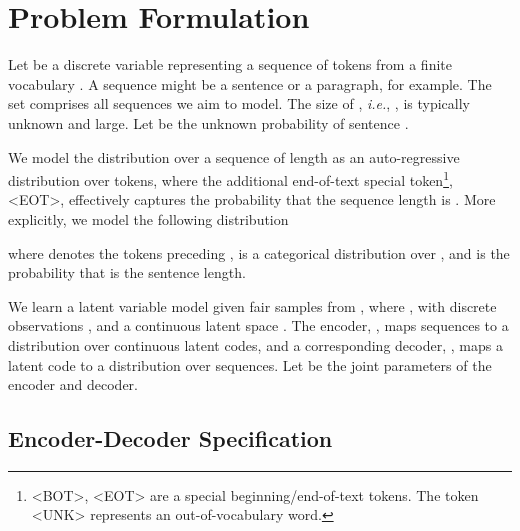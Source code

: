 \documentclass{article}
\newcommand{\ie}{{\em i.e.}}
\begin{document}
 

\section{Problem Formulation}

Let  be a discrete variable representing
a sequence of  tokens from a finite vocabulary .
A sequence might be a sentence or a paragraph, for example.
The set  comprises all sequences we aim to model.
The size of , \ie, , is typically unknown and large.
Let  be the unknown probability of sentence .

We model the distribution over a sequence of length  as an auto-regressive distribution over  tokens, 
where the additional end-of-text special token\footnote{\textsc{<BOT>}, \textsc{<EOT>} are a special beginning/end-of-text tokens. The token \textsc{<UNK>} represents an out-of-vocabulary word.},  \textsc{<EOT>}, 
effectively captures the probability that the sequence length is .
More explicitly, we model the following distribution

where  denotes the tokens preceding ,
 is a categorical distribution over , 
and  is the probability that  is the sentence length.

We learn a latent variable model given  fair samples from , where , with
discrete observations , and a continuous latent space .
The encoder, , maps sequences to a distribution over continuous latent codes,
and a corresponding decoder, , maps a latent code to a distribution over sequences.
Let  be the joint parameters of the encoder and decoder.







\subsection{Encoder-Decoder Specification} \label{sec:nlp-formulation}
\end{document}
